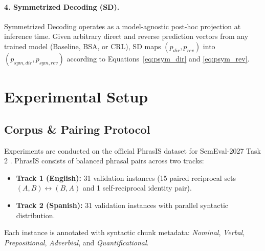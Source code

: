 \documentclass[11pt,a4paper,twocolumn]{article}
\begin{document}
\paragraph{4. Symmetrized Decoding (SD).}
Symmetrized Decoding operates as a model-agnostic post-hoc projection at inference time. Given arbitrary direct and reverse prediction vectors from any trained model (Baseline, BSA, or CRL), SD maps $(p_{dir}, p_{rev})$ into $(p_{sym,dir}, p_{sym,rev})$ according to Equations~\eqref{eq:psym_dir} and \eqref{eq:psym_rev}.

\section{Experimental Setup}
\label{sec:experiments}

\subsection{Corpus \& Pairing Protocol}
Experiments are conducted on the official PhrasIS dataset for SemEval-2027 Task 2 \citep{lopezgazpio2027phrasis}. PhrasIS consists of balanced phrasal pairs across two tracks:
\begin{itemize}
    \item \textbf{Track 1 (English):} 31 validation instances (15 paired reciprocal sets $(A, B) \leftrightarrow (B, A)$ and 1 self-reciprocal identity pair).
    \item \textbf{Track 2 (Spanish):} 31 validation instances with parallel syntactic distribution.
\end{itemize}
Each instance is annotated with syntactic chunk metadata: \textit{Nominal}, \textit{Verbal}, \textit{Prepositional}, \textit{Adverbial}, and \textit{Quantificational}.
\end{document}
